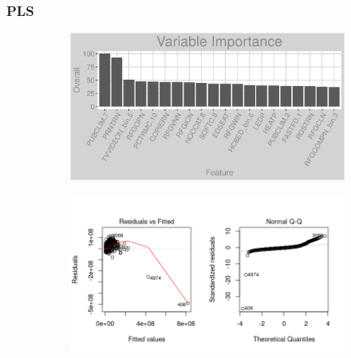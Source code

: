 \subsubsection{PLS}
\label{appendix:electricity:pls}
\begin{figure}[h]
\begin{subfigure}{1\textwidth}
\includegraphics[width=.99\textwidth, height=0.3\textheight]{Images/electricity_pls_vars.png}
\centering
\end{subfigure}
\begin{subfigure}{1\textwidth}
\includegraphics[width=.99\textwidth, height=0.475\textheight]{Images/electricity_pls_res_1.png}
\centering
\end{subfigure}
\end{figure}
\newpage
